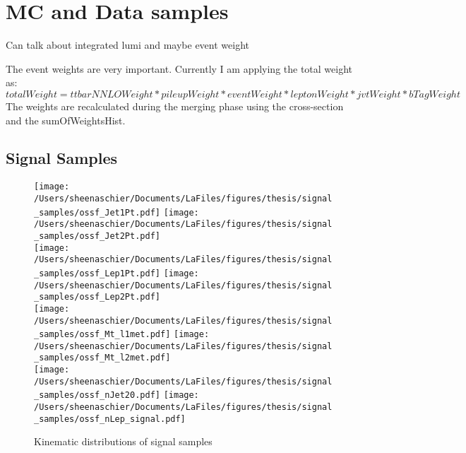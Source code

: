 \chapter{MC and Data samples}
 Can talk about integrated lumi and maybe event weight


The event weights are very important.  Currently I am applying the total weight as:
\begin{equation}
\label{eq:weight}
totalWeight = ttbarNNLOWeight*pileupWeight*eventWeight*leptonWeight*jvtWeight*bTagWeight
\end{equation}
The weights are recalculated during the merging phase using the cross-section and the sumOfWeightsHist.\

\section{Signal Samples}

  \begin{figure}[tbp]
\texttt{[image: /Users/sheenaschier/Documents/LaFiles/figures/thesis/signal\_samples/ossf\_Jet1Pt.pdf]}
\texttt{[image: /Users/sheenaschier/Documents/LaFiles/figures/thesis/signal\_samples/ossf\_Jet2Pt.pdf]}\\
 \texttt{[image: /Users/sheenaschier/Documents/LaFiles/figures/thesis/signal\_samples/ossf\_Lep1Pt.pdf]}
 \texttt{[image: /Users/sheenaschier/Documents/LaFiles/figures/thesis/signal\_samples/ossf\_Lep2Pt.pdf]}\\
 \texttt{[image: /Users/sheenaschier/Documents/LaFiles/figures/thesis/signal\_samples/ossf\_Mt\_l1met.pdf]}
 \texttt{[image: /Users/sheenaschier/Documents/LaFiles/figures/thesis/signal\_samples/ossf\_Mt\_l2met.pdf]}\\
  \texttt{[image: /Users/sheenaschier/Documents/LaFiles/figures/thesis/signal\_samples/ossf\_nJet20.pdf]}
 \texttt{[image: /Users/sheenaschier/Documents/LaFiles/figures/thesis/signal\_samples/ossf\_nLep\_signal.pdf]}\\
   \caption{Kinematic distributions of signal samples}
   \label{fig:SigSample1}
 \end{figure}
 
